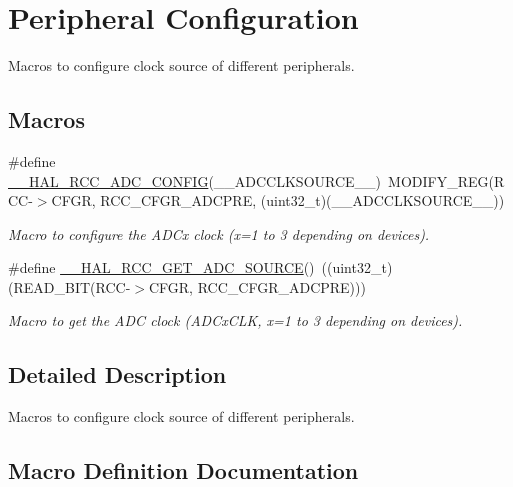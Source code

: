\hypertarget{group___r_c_c_ex___peripheral___configuration}{}\section{Peripheral Configuration}
\label{group___r_c_c_ex___peripheral___configuration}


Macros to configure clock source of different peripherals.  


\subsection*{Macros}
\begin{DoxyCompactItemize}
\item 
\#define \hyperlink{group___r_c_c_ex___peripheral___configuration_ga4c75b81d1b7d65cda934c9f1350ea97b}{\+\_\+\+\_\+\+H\+A\+L\+\_\+\+R\+C\+C\+\_\+\+A\+D\+C\+\_\+\+C\+O\+N\+F\+IG}(\+\_\+\+\_\+\+A\+D\+C\+C\+L\+K\+S\+O\+U\+R\+C\+E\+\_\+\+\_\+)~M\+O\+D\+I\+F\+Y\+\_\+\+R\+EG(R\+CC-\/$>$C\+F\+GR, R\+C\+C\+\_\+\+C\+F\+G\+R\+\_\+\+A\+D\+C\+P\+RE, (uint32\+\_\+t)(\+\_\+\+\_\+\+A\+D\+C\+C\+L\+K\+S\+O\+U\+R\+C\+E\+\_\+\+\_\+))
\begin{DoxyCompactList}\small\item\em Macro to configure the A\+D\+Cx clock (x=1 to 3 depending on devices). \end{DoxyCompactList}\item 
\#define \hyperlink{group___r_c_c_ex___peripheral___configuration_ga2ee9f1838a8450f949b548a06ed3bc58}{\+\_\+\+\_\+\+H\+A\+L\+\_\+\+R\+C\+C\+\_\+\+G\+E\+T\+\_\+\+A\+D\+C\+\_\+\+S\+O\+U\+R\+CE}()~((uint32\+\_\+t)(R\+E\+A\+D\+\_\+\+B\+IT(R\+CC-\/$>$C\+F\+GR, R\+C\+C\+\_\+\+C\+F\+G\+R\+\_\+\+A\+D\+C\+P\+RE)))
\begin{DoxyCompactList}\small\item\em Macro to get the A\+DC clock (A\+D\+Cx\+C\+LK, x=1 to 3 depending on devices). \end{DoxyCompactList}\end{DoxyCompactItemize}


\subsection{Detailed Description}
Macros to configure clock source of different peripherals. 



\subsection{Macro Definition Documentation}
\mbox{\label{group___r_c_c_ex___peripheral___configuration_ga4c75b81d1b7d65cda934c9f1350ea97b}} 
